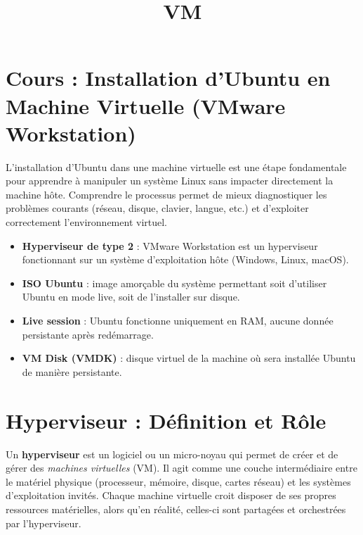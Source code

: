 \documentclass[11pt,a4paper]{article}
\title{VM }
\author{}
\date{}
\begin{document}
\maketitle
\tableofcontents

\newpage

\section{Cours : Installation d’Ubuntu en Machine Virtuelle (VMware Workstation)}


\begin{tcolorbox}[title={Introduction}]
L’installation d’Ubuntu dans une machine virtuelle est une étape fondamentale pour apprendre à manipuler un système Linux sans impacter directement la machine hôte. Comprendre le processus permet de mieux diagnostiquer les problèmes courants (réseau, disque, clavier, langue, etc.) et d’exploiter correctement l’environnement virtuel.
\end{tcolorbox}

\begin{tcolorbox}[title={1. Concepts de base}]
\begin{itemize}
  \item \textbf{Hyperviseur de type 2} : VMware Workstation est un hyperviseur fonctionnant sur un système d’exploitation hôte (Windows, Linux, macOS).  
  \item \textbf{ISO Ubuntu} : image amorçable du système permettant soit d’utiliser Ubuntu en mode live, soit de l’installer sur disque.  
  \item \textbf{Live session} : Ubuntu fonctionne uniquement en RAM, aucune donnée persistante après redémarrage.  
  \item \textbf{VM Disk (VMDK)} : disque virtuel de la machine où sera installée Ubuntu de manière persistante.
\end{itemize}
\end{tcolorbox}




\section{Hyperviseur : Définition et Rôle}


\begin{tcolorbox}[title={Définition}]
Un \textbf{hyperviseur} est un logiciel ou un micro-noyau qui permet de créer et de gérer des \emph{machines virtuelles} (VM).  
Il agit comme une couche intermédiaire entre le matériel physique (processeur, mémoire, disque, cartes réseau) et les systèmes d’exploitation invités.  
Chaque machine virtuelle croit disposer de ses propres ressources matérielles, alors qu’en réalité, celles-ci sont partagées et orchestrées par l’hyperviseur.
\end{tcolorbox}
\end{document}
